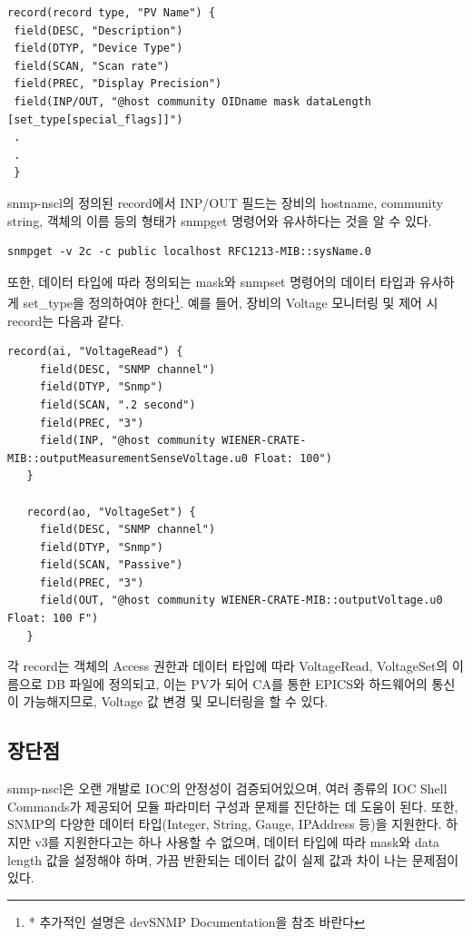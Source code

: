 \documentclass[11pt
  , a4paper
  , article
  , oneside
]{memoir}
\begin{document}
\begin{lstlisting}[style=termstyle]
record(record type, "PV Name") {
 field(DESC, "Description")
 field(DTYP, "Device Type")
 field(SCAN, "Scan rate")
 field(PREC, "Display Precision")
 field(INP/OUT, "@host community OIDname mask dataLength [set_type[special_flags]]")
 .
 .
 }
\end{lstlisting}

snmp-nscl의 정의된 record에서 INP/OUT 필드는 장비의 hostname, community string, 객체의 이름 등의 형태가 snmpget 명령어와 유사하다는 것을 알 수 있다. 

\begin{lstlisting}[style=termstyle]
snmpget -v 2c -c public localhost RFC1213-MIB::sysName.0
\end{lstlisting}

또한, 데이터 타입에 따라 정의되는 mask와 snmpset 명령어의 데이터 타입과 유사하게 set\_type을 정의하여야 한다\footnote{* 추가적인 설명은 devSNMP Documentation\citep{devsnmp}을 참조 바란다}. 예를 들어, 장비의 Voltage 모니터링 및 제어 시 record는 다음과 같다.

\begin{lstlisting}[style=termstyle]
   record(ai, "VoltageRead") {
     field(DESC, "SNMP channel")
     field(DTYP, "Snmp")
     field(SCAN, ".2 second")
     field(PREC, "3")
     field(INP, "@host community WIENER-CRATE-MIB::outputMeasurementSenseVoltage.u0 Float: 100")
   }

   record(ao, "VoltageSet") {
     field(DESC, "SNMP channel")
     field(DTYP, "Snmp")
     field(SCAN, "Passive")
     field(PREC, "3")
     field(OUT, "@host community WIENER-CRATE-MIB::outputVoltage.u0 Float: 100 F")
   }
\end{lstlisting}

각 record는 객체의 Access 권한과 데이터 타입에 따라 VoltageRead, VoltageSet의 이름으로 DB 파일에 정의되고, 이는 PV가 되어 CA를 통한 EPICS와 하드웨어의 통신이 가능해지므로, Voltage 값 변경 및 모니터링을 할 수 있다.

\subsection{장단점}

snmp-nscl은 오랜 개발로 IOC의 안정성이 검증되어있으며, 여러 종류의 IOC Shell Commands가 제공되어 모듈 파라미터 구성과 문제를 진단하는 데 도움이 된다. 또한, SNMP의 다양한 데이터 타입(Integer, String, Gauge, IPAddress 등)을 지원한다. 하지만 v3를 지원한다고는 하나 사용할 수 없으며, 데이터 타입에 따라 mask와 data length 값을 설정해야 하며, 가끔 반환되는 데이터 값이 실제 값과 차이 나는 문제점이 있다.
\end{document}
